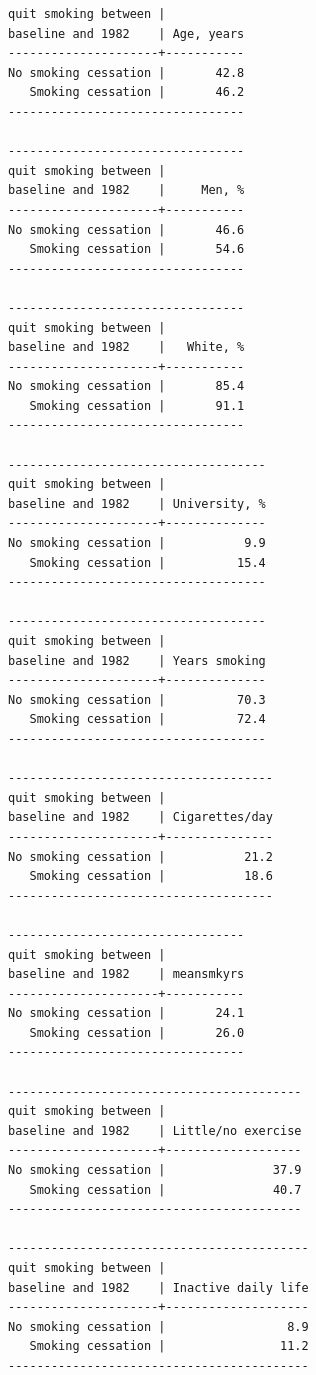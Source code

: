 \documentclass[
  10pt,
  a4paper,
]{book}
\begin{document}
\begin{verbatim}
quit smoking between |
baseline and 1982    | Age, years
---------------------+-----------
No smoking cessation |       42.8
   Smoking cessation |       46.2
---------------------------------

---------------------------------
quit smoking between |
baseline and 1982    |     Men, %
---------------------+-----------
No smoking cessation |       46.6
   Smoking cessation |       54.6
---------------------------------

---------------------------------
quit smoking between |
baseline and 1982    |   White, %
---------------------+-----------
No smoking cessation |       85.4
   Smoking cessation |       91.1
---------------------------------

------------------------------------
quit smoking between |
baseline and 1982    | University, %
---------------------+--------------
No smoking cessation |           9.9
   Smoking cessation |          15.4
------------------------------------

------------------------------------
quit smoking between |
baseline and 1982    | Years smoking
---------------------+--------------
No smoking cessation |          70.3
   Smoking cessation |          72.4
------------------------------------

-------------------------------------
quit smoking between |
baseline and 1982    | Cigarettes/day
---------------------+---------------
No smoking cessation |           21.2
   Smoking cessation |           18.6
-------------------------------------

---------------------------------
quit smoking between |
baseline and 1982    | meansmkyrs
---------------------+-----------
No smoking cessation |       24.1
   Smoking cessation |       26.0
---------------------------------

-----------------------------------------
quit smoking between |
baseline and 1982    | Little/no exercise
---------------------+-------------------
No smoking cessation |               37.9
   Smoking cessation |               40.7
-----------------------------------------

------------------------------------------
quit smoking between |
baseline and 1982    | Inactive daily life
---------------------+--------------------
No smoking cessation |                 8.9
   Smoking cessation |                11.2
------------------------------------------
\end{verbatim}
\end{document}
